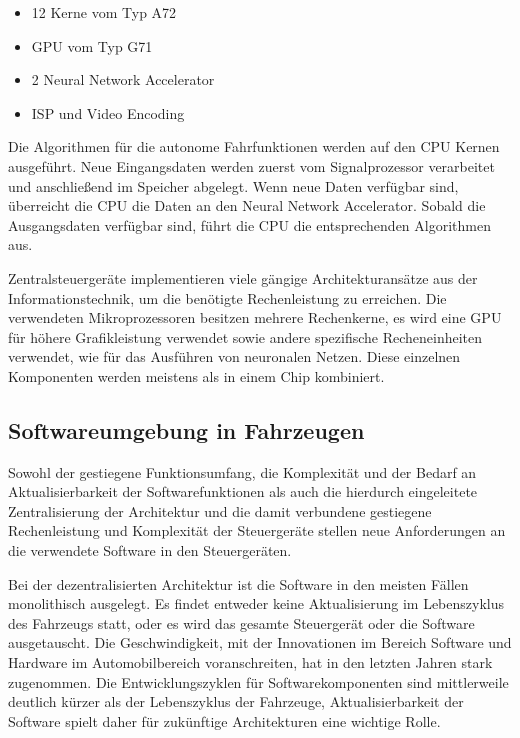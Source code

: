 \begin{itemize}
	\item 12 Kerne vom Typ A72
	\item GPU vom Typ G71
	\item 2 Neural Network Accelerator
	\item ISP und Video Encoding
\end{itemize}

Die Algorithmen für die autonome Fahrfunktionen werden auf den CPU Kernen ausgeführt. Neue Eingangsdaten werden zuerst vom Signalprozessor verarbeitet und anschließend im Speicher abgelegt. Wenn neue Daten verfügbar sind, überreicht die CPU die Daten an den Neural Network Accelerator. Sobald die Ausgangsdaten verfügbar sind, führt die CPU die entsprechenden Algorithmen aus. \cite{Talpes2020}

Zentralsteuergeräte implementieren viele gängige Architekturansätze aus der Informationstechnik, um die benötigte Rechenleistung zu erreichen. Die verwendeten Mikroprozessoren besitzen mehrere Rechenkerne, es wird eine GPU für höhere Grafikleistung verwendet sowie andere spezifische Recheneinheiten verwendet, wie für das Ausführen von neuronalen Netzen. Diese einzelnen Komponenten werden meistens als  in einem Chip kombiniert.

\subsection{Softwareumgebung in Fahrzeugen}

Sowohl der gestiegene Funktionsumfang, die Komplexität und der Bedarf an Aktualisierbarkeit der Softwarefunktionen als auch die hierdurch eingeleitete Zentralisierung der  Architektur und die damit verbundene gestiegene Rechenleistung und Komplexität der Steuergeräte stellen neue Anforderungen an die verwendete Software in den Steuergeräten. 

Bei der dezentralisierten  Architektur ist die Software in den meisten Fällen monolithisch ausgelegt. Es findet entweder keine Aktualisierung im Lebenszyklus des Fahrzeugs statt, oder es wird das gesamte Steuergerät oder die Software ausgetauscht. Die Geschwindigkeit, mit der Innovationen im Bereich Software und Hardware im Automobilbereich voranschreiten, hat in den letzten Jahren stark zugenommen. Die Entwicklungszyklen für Softwarekomponenten sind mittlerweile deutlich kürzer als der Lebenszyklus der Fahrzeuge, Aktualisierbarkeit der Software spielt daher für zukünftige Architekturen eine wichtige Rolle. \cite{Mundhenk2017}

